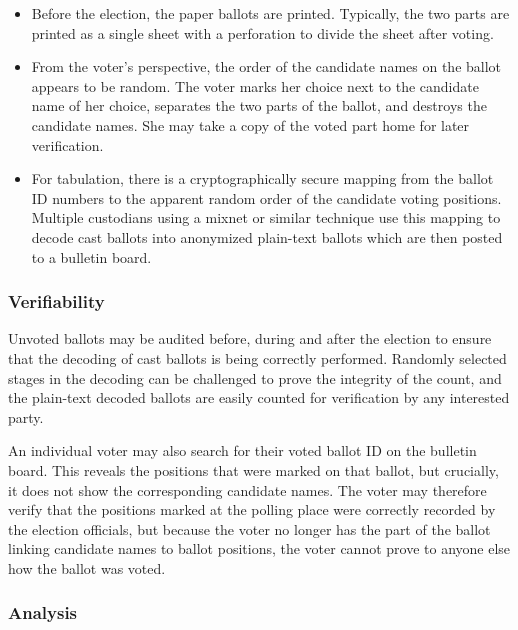 \begin{itemize}

\item Before the election, the paper ballots are printed. Typically,
  the two parts are printed as a single sheet with a perforation to
  divide the sheet after voting.

\item From the voter's perspective, the order of the candidate names
  on the ballot appears to be random. The voter marks her choice next
  to the candidate name of her choice, separates the two parts of the
  ballot, and destroys the candidate names. She may take a copy of the
  voted part home for later verification.

\item For tabulation, there is a cryptographically secure mapping from
  the ballot ID numbers to the apparent random order of the candidate
  voting positions. Multiple custodians using a mixnet or similar
  technique use this mapping to decode cast ballots into anonymized
  plain-text ballots which are then posted to a bulletin board.

\end{itemize}

\subsubsection{Verifiability}

Unvoted ballots may be audited before, during and after the election
to ensure that the decoding of cast ballots is being correctly
performed. Randomly selected stages in the decoding can be challenged
to prove the integrity of the count, and the plain-text decoded
ballots are easily counted for verification by any interested party.

An individual voter may also search for their voted ballot ID on the
bulletin board. This reveals the positions that were marked on that
ballot, but crucially, it does not show the corresponding candidate
names. The voter may therefore verify that the positions marked at the
polling place were correctly recorded by the election officials, but
because the voter no longer has the part of the ballot linking
candidate names to ballot positions, the voter cannot prove to anyone
else how the ballot was voted.

\subsubsection{Analysis}

